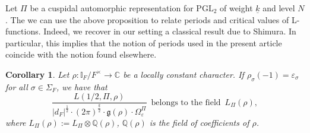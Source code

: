 \documentclass{amsart}
\newtheorem{corollary}[theorem]{Corollary}
\theoremstyle{definition}
\theoremstyle{remark}
\numberwithin{equation}{section}
\newcommand{\PGL}{{\mathrm{PGL}}}
\newcommand{\Q}{{\mathbb Q}}
\newcommand{\C}{{\mathbb C}}
\newcommand{\I}{{\mathbb I}}
\begin{document}
Let $\Pi$ be a cuspidal automorphic representation for $\PGL_2$ of weight $\underline k$ and level $N$. The we can use the above proposition to relate periods and critical values of L-functions. Indeed, we recover in our setting a classical result due to Shimura. In particular, this implies that the notion of periods used in the present article coincide with the notion found elsewhere.
\begin{corollary}\label{ShimRel}
    Let $\rho:\I_F/F^\times\rightarrow\C$ be a locally constant character. If $\rho_{\sigma}(-1)=\varepsilon_\sigma$ for all $\sigma\in\Sigma_F$, we have that 
    \[
    \frac{L(1/2,\Pi, \rho)}{|d_F|^{\frac{1}{2}}\cdot(2\pi)^{\frac{\underline k}{2}}\cdot\mathfrak{g}(\rho)\cdot \Omega_\varepsilon^\Pi}\,\text{ belongs to the field }\, L_{\Pi}(\rho),
    \]
    where $L_{\Pi}(\rho):=L_\Pi\otimes\Q(\rho)$, $\Q(\rho)$ is the field of coefficients of $\rho$.
\end{corollary}
\end{document}
